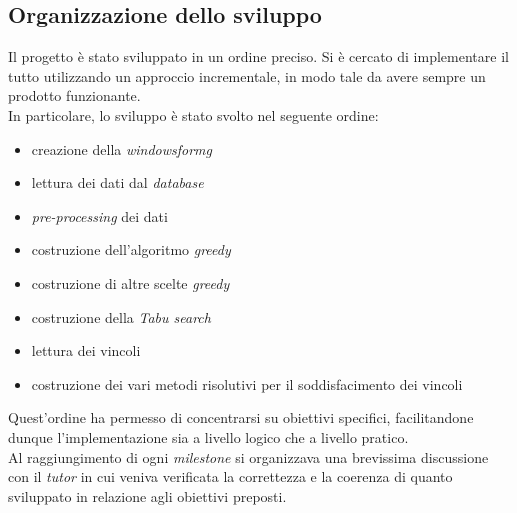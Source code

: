 \subsection{Organizzazione dello sviluppo}
\label{sec:organizzazione-sviluppo}
\noindent Il progetto è stato sviluppato in un
ordine preciso. Si è cercato di implementare il tutto utilizzando
un approccio incrementale, in modo tale da avere
sempre un prodotto funzionante.\\
In particolare, lo sviluppo è stato svolto nel seguente ordine:
\begin{itemize}
    \item creazione della \textit{\gls{windowsformg}}
    \item lettura dei dati dal \textit{database}
    \item \textit{pre-processing} dei dati
    \item costruzione dell'algoritmo \textit{greedy}
    \item costruzione di altre scelte \textit{greedy}
    \item costruzione della \textit{Tabu search}
    \item lettura dei vincoli
    \item costruzione dei vari metodi risolutivi
    per il soddisfacimento dei vincoli
\end{itemize}

\noindent Quest'ordine ha permesso di concentrarsi su obiettivi specifici,
facilitandone dunque l'implementazione sia a livello logico che a livello pratico.\\

\noindent Al raggiungimento di ogni \textit{milestone} si
organizzava una brevissima discussione con il \textit{tutor}
in cui veniva verificata la correttezza e la coerenza di quanto
sviluppato in relazione agli obiettivi preposti.

